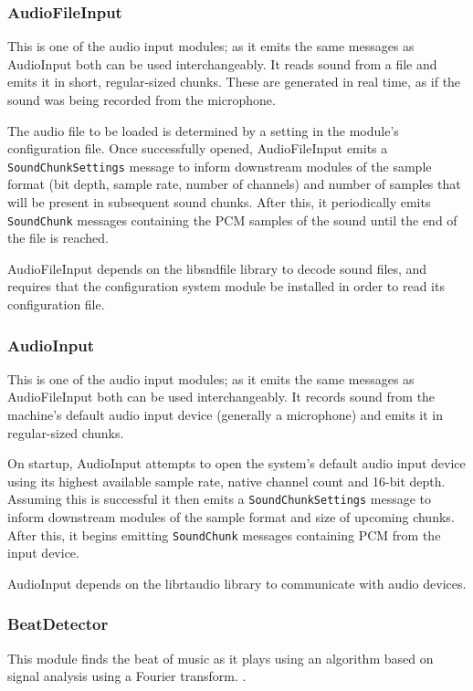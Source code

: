 \documentclass[english,12pt]{scrartcl}
\begin{document}
			
			\subsubsection{AudioFileInput}
				This is one of the audio input modules; as it emits the same messages as
				AudioInput both can be used interchangeably. It reads sound from a file and emits
				it in short, regular-sized chunks. These are generated in real time, as if the
				sound was being recorded from the microphone.
				
				The audio file to be loaded is determined by a setting in the module's
				configuration file. Once successfully opened, AudioFileInput emits a
				\texttt{SoundChunkSettings} message to inform downstream modules of the sample
				format (bit depth, sample rate, number of channels)	and number of samples that
				will be present in subsequent sound chunks. After this, it periodically emits
				\texttt{SoundChunk} messages containing the PCM samples of the sound until
				the end of the file is reached.
				
				AudioFileInput depends on the libsndfile library to decode sound files, and
				requires that the configuration system module be installed in order to read its
				configuration file.
			
			
			\subsubsection{AudioInput}
				This is one of the audio input modules; as it emits the same messages as
				AudioFileInput both can be used interchangeably. It records sound from the
				machine's default audio input device (generally a microphone) and emits it in
				regular-sized chunks.
				
				On startup, AudioInput attempts to open the system's default audio input device
				using its highest available sample rate, native channel count and 16-bit depth.
				Assuming this is successful it then emits a \texttt{SoundChunkSettings} message
				to inform downstream modules of the sample format and size of upcoming chunks.
				After this, it begins emitting \texttt{SoundChunk} messages containing PCM from
				the input device.
				
				AudioInput depends on the librtaudio library to communicate with audio devices.
				
				
			\subsubsection{BeatDetector}
				This module finds the beat of music as it plays using an algorithm based on signal analysis using a Fourier transform.
				.
				
\end{document}
